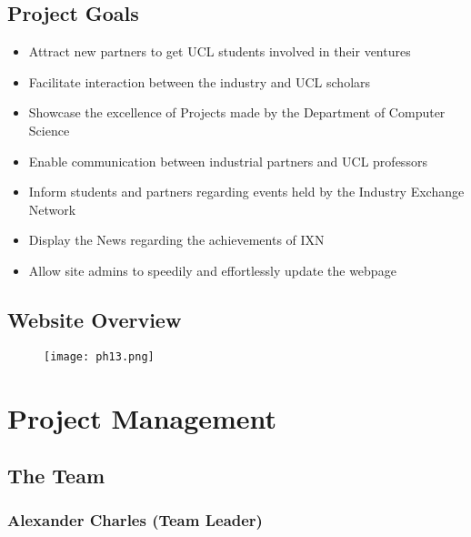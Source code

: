 \documentclass[fontsize=11pt]{extarticle}
\numberwithin{figure}{section} %
\begin{document}
\hypertarget{project-goals}{%
\subsection{Project Goals}\label{project-goals}}

\begin{itemize}
\item
  Attract new partners to get UCL students involved in their ventures
\item
  Facilitate interaction between the industry and UCL scholars
\item
  Showcase the excellence of Projects made by the Department of Computer
  Science
\item
  Enable communication between industrial partners and UCL professors
\item
  Inform students and partners regarding events held by the Industry
  Exchange Network
\item
  Display the News regarding the achievements of IXN
\item
  Allow site admins to speedily and effortlessly update the webpage
\end{itemize}

\hypertarget{website-overview}{%
\subsection{Website Overview}\label{website-overview}}

\begin{figure}[H]
      \centering
      \texttt{[image: ph13.png]}
 \end{figure}

\hypertarget{project-management}{%
\section{Project Management}\label{project-management}}

\hypertarget{the-team}{%
\subsection{The Team}\label{the-team}}

\hypertarget{alexander-charles-team-leader}{%
\subsubsection{Alexander Charles (Team
Leader)}\label{alexander-charles-team-leader}}
\end{document}
